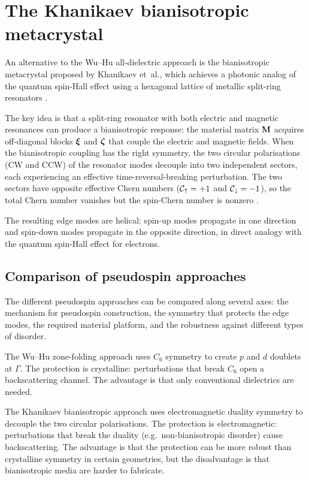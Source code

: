\section{The Khanikaev bianisotropic metacrystal}
\label{sec:ch11-khanikaev-bianisotropic}

An alternative to the Wu--Hu all-dielectric approach is the
bianisotropic metacrystal proposed by Khanikaev et~al., which achieves
a photonic analog of the quantum spin-Hall effect using a hexagonal
lattice of metallic split-ring resonators \cite{ozawa2018topological}.

The key idea is that a split-ring resonator with both electric and
magnetic resonances can produce a bianisotropic response: the material
matrix $\mathbf{M}$ acquires off-diagonal blocks $\boldsymbol{\xi}$ and $\boldsymbol{\zeta}$ that
couple the electric and magnetic fields.  When the bianisotropic
coupling has the right symmetry, the two circular polarisations (CW
and CCW) of the resonator modes decouple into two independent sectors,
each experiencing an effective time-reversal-breaking perturbation.
The two sectors have opposite effective Chern numbers
($\mathcal{C}_\uparrow=+1$ and $\mathcal{C}_\downarrow=-1$), so the total
Chern number vanishes but the spin-Chern number is nonzero
\cite{ozawa2018topological,price2022roadmap}.

The resulting edge modes are helical: spin-up modes propagate in one
direction and spin-down modes propagate in the opposite direction, in
direct analogy with the quantum spin-Hall effect for electrons.

\subsection{Comparison of pseudospin approaches}
\label{sec:ch11-comparison-table}

The different pseudospin approaches can be compared along several
axes: the mechanism for pseudospin construction, the symmetry that
protects the edge modes, the required material platform, and the
robustness against different types of disorder.

The Wu--Hu zone-folding approach uses $C_6$ symmetry to create $p$
and $d$ doublets at $\Gamma$.  The protection is crystalline:
perturbations that break $C_6$ open a backscattering channel.  The
advantage is that only conventional dielectrics are needed.

The Khanikaev bianisotropic approach uses electromagnetic duality
symmetry to decouple the two circular polarisations.  The protection
is electromagnetic: perturbations that break the duality (e.g.\
non-bianisotropic disorder) cause backscattering.  The advantage is
that the protection can be more robust than crystalline symmetry in
certain geometries, but the disadvantage is that bianisotropic media
are harder to fabricate.

